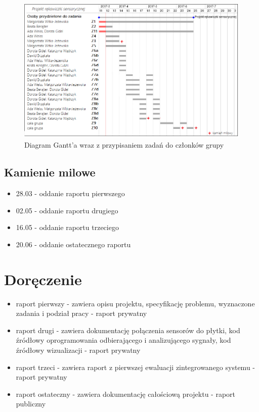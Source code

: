 \documentclass{article}
\begin{document}
\begin{figure}[h!]
\centering
\includegraphics[scale=0.8]{projekt-rekawiczki-sensorycznej-gantt.png}
\caption{Diagram Gantt'a wraz z przypisaniem zadań do członków grupy}
\label{fig:projekt-rekawiczki-sensorycznej-gantt}
\end{figure}
\subsection{Kamienie milowe}
\begin{itemize}
\item 28.03 - oddanie raportu pierwszego
\item 02.05 - oddanie raportu drugiego
\item 16.05 - oddanie raportu trzeciego
\item 20.06 - oddanie ostatecznego raportu
\end{itemize}


\section{Doręczenie}
\begin{itemize}
\item raport pierwszy -  zawiera opisu projektu, specyfikację problemu, wyznaczone zadania i podział pracy - raport prywatny
\item raport drugi - zawiera dokumentację połączenia sensorów do płytki, kod źródłowy oprogramowania odbierającego i analizującego sygnały, kod źródłowy wizualizacji - raport prywatny
\item raport trzeci - zawiera raport z pierwszej ewaluacji zintegrowanego systemu - raport prywatny
\item raport ostateczny - zawiera dokumentację całościową projektu - raport publiczny
\end{itemize}
\end{document}
